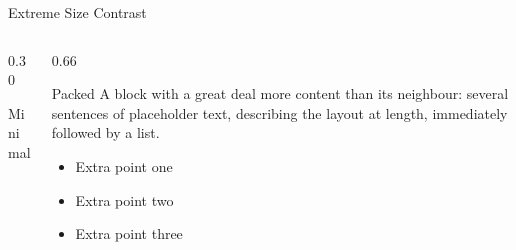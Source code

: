 \documentclass[aspectratio=169]{beamer}
\begin{document}
\begin{frame}{Extreme Size Contrast}
  \begin{columns}[T]
    \begin{column}{0.30\textwidth}
      \begin{block}{Minimal}
      \end{block}
    \end{column}
    \begin{column}{0.66\textwidth}
      \begin{block}{Packed}
        {\small A block with a great deal more content than its
        neighbour: several sentences of placeholder text, describing
        the layout at length, immediately followed by a list.}
        \begin{itemize}
          \item Extra point one
          \item Extra point two
          \item Extra point three
        \end{itemize}
      \end{block}
    \end{column}
  \end{columns}
\end{frame}
\end{document}
